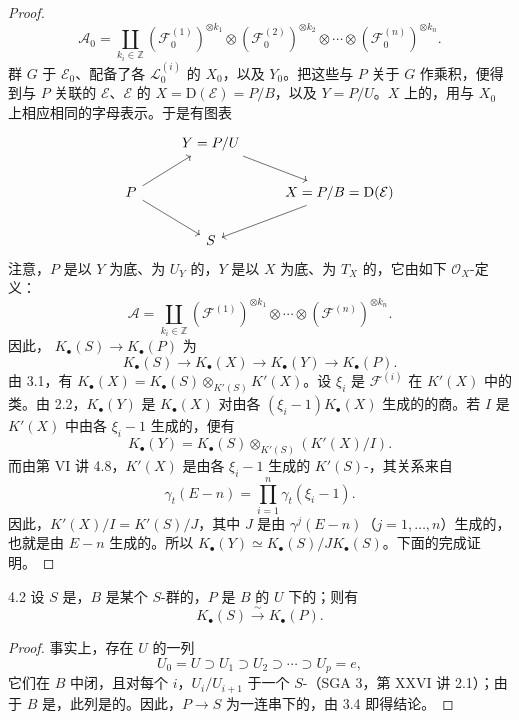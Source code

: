 \begin{proof}
\[
\mathcal A_0=\coprod_{k_i\in\mathbb Z}
(\mathcal F_0^{(1)})^{\otimes k_1}\otimes
(\mathcal F_0^{(2)})^{\otimes k_2}\otimes\cdots\otimes
(\mathcal F_0^{(n)})^{\otimes k_n}.
\]
群 $G$ 于 $\mathcal E_0$、配备了各 $\mathcal L_0^{(i)}$ 的 $X_0$，以及 $Y_0$。把这些与 $P$ 关于 $G$ 作乘积，便得到与 $P$ 关联的 $\mathcal E$、$\mathcal E$ 的 $X=\mathrm D(\mathcal E)=P/B$，以及 $Y=P/U$。$X$ 上的，用与 $X_0$ 上相应相同的字母表示。于是有图表
\[
\begin{tikzcd}
&Y=P/U\arrow[dr]&\\
P\arrow[ur]\arrow[dr]&&X=P/B=\mathrm D(\mathcal E)\arrow[dl]\\
&S&
\end{tikzcd}
\]
注意，$P$ 是以 $Y$ 为底、为 $U_Y$ 的，$Y$ 是以 $X$ 为底、为 $T_X$ 的，它由如下 $\mathcal O_X$-定义：
\[
\mathcal A=\coprod_{k_i\in\mathbb Z}
(\mathcal F^{(1)})^{\otimes k_1}\otimes\cdots\otimes(\mathcal F^{(n)})^{\otimes k_n}.
\]
因此， $K_\bullet(S)\to K_\bullet(P)$ 为
\[
K_\bullet(S)\longrightarrow K_\bullet(X)\longrightarrow K_\bullet(Y)\longrightarrow K_\bullet(P).
\]
由 3.1，有 $K_\bullet(X)=K_\bullet(S)\otimes_{K'(S)}K'(X)$。设 $\xi_i$ 是 $\mathcal F^{(i)}$ 在 $K'(X)$ 中的类。由 2.2，$K_\bullet(Y)$ 是 $K_\bullet(X)$ 对由各 $(\xi_i-1)K_\bullet(X)$ 生成的的商。若 $I$ 是 $K'(X)$ 中由各 $\xi_i-1$ 生成的，便有
\[
K_\bullet(Y)=K_\bullet(S)\otimes_{K'(S)}(K'(X)/I).
\]
而由第 VI 讲 4.8，$K'(X)$ 是由各 $\xi_i-1$ 生成的 $K'(S)$-，其关系来自
\[
\gamma_t(E-n)=\prod_{i=1}^n\gamma_t(\xi_i-1).
\]
因此，$K'(X)/I=K'(S)/J$，其中 $J$ 是由 $\gamma^j(E-n)$（$j=1,\ldots,n$）生成的，也就是由 $E-n$ 生成的。所以 $K_\bullet(Y)\simeq K_\bullet(S)/JK_\bullet(S)$。下面的完成证明。
\end{proof}

\begin{SGAresult}{}{4.2}
设 $S$ 是，$B$ 是某个 $S$-群的，$P$ 是 $B$ 的 $U$ 下的；则有
\[
K_\bullet(S)\xrightarrow{\sim}K_\bullet(P).
\]
\end{SGAresult}
\begin{proof}
事实上，存在 $U$ 的一列
\[
U_0=U\supset U_1\supset U_2\supset\cdots\supset U_p=e,
\]
它们在 $B$ 中闭，且对每个 $i$，$U_i/U_{i+1}$ 于一个 $S$-（SGA 3，第 XXVI 讲 2.1）；由于 $B$ 是，此列是的。因此，$P\to S$ 为一连串下的，由 3.4 即得结论。
\end{proof}

